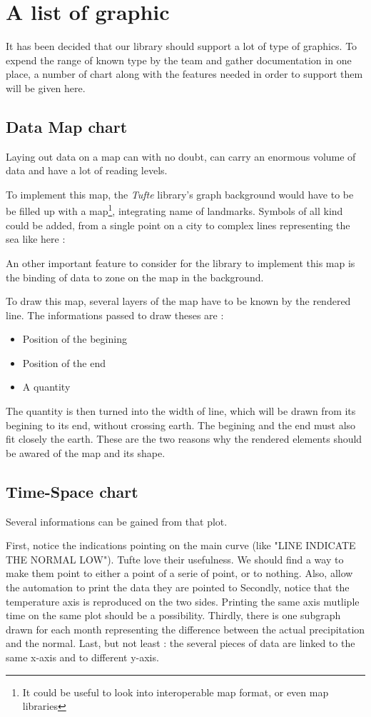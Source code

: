 \section{A list of graphic}
It has been decided that our library should support a lot of type of graphics. To expend the range of known type by the team and gather documentation in one place, a number of chart along with the features needed in order to support them will be given here.

\subsection{Data Map chart}
Laying out data on a map can with no doubt, can carry an enormous volume of data and have a lot of reading levels.

To implement this map, the \textit{Tufte} library's graph background would have to be be filled up with a map\footnote{It could be useful to look into interoperable map format, or even map libraries}, integrating name of landmarks. Symbols of all kind could be added, from a single point on a city to complex lines representing the sea like here :

An other important feature to consider for the library to implement this map is the binding of data to zone on the map in the background.

To draw this map, several layers of the map have to be known by the rendered line. The informations passed to draw theses are :
\begin{itemize}
\item Position of the begining
\item Position of the end
\item A quantity
\end{itemize}
The quantity is then turned into the width of line, which will be drawn from its begining to its end, without crossing earth.
The begining and the end must also fit closely the earth. These are the two reasons why the rendered elements should be awared of the map and its shape.

\subsection{Time-Space chart}
Several informations can be gained from that plot.

First, notice the indications pointing on the main curve (like "LINE INDICATE THE NORMAL LOW"). Tufte love their usefulness. We should find a way to make them point to either a point of a serie of point, or to nothing. Also, allow the automation to print the data they are pointed to
Secondly, notice that the temperature axis is reproduced on the two sides. Printing the same axis mutliple time on the same plot should be a possibility. 
Thirdly, there is one subgraph drawn for each month representing the difference between the actual precipitation and the normal.
Last, but not least : the several pieces of data are linked to the same x-axis and to different y-axis.


